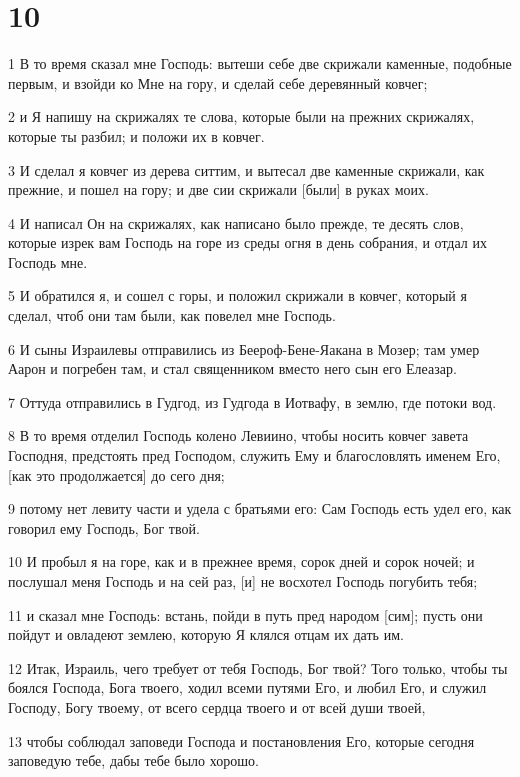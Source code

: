 \chapter{10}

\par 1 В то время сказал мне Господь: вытеши себе две скрижали каменные, подобные первым, и взойди ко Мне на гору, и сделай себе деревянный ковчег;
\par 2 и Я напишу на скрижалях те слова, которые были на прежних скрижалях, которые ты разбил; и положи их в ковчег.
\par 3 И сделал я ковчег из дерева ситтим, и вытесал две каменные скрижали, как прежние, и пошел на гору; и две сии скрижали [были] в руках моих.
\par 4 И написал Он на скрижалях, как написано было прежде, те десять слов, которые изрек вам Господь на горе из среды огня в день собрания, и отдал их Господь мне.
\par 5 И обратился я, и сошел с горы, и положил скрижали в ковчег, который я сделал, чтоб они там были, как повелел мне Господь.
\par 6 И сыны Израилевы отправились из Беероф-Бене-Яакана в Мозер; там умер Аарон и погребен там, и стал священником вместо него сын его Елеазар.
\par 7 Оттуда отправились в Гудгод, из Гудгода в Иотвафу, в землю, где потоки вод.
\par 8 В то время отделил Господь колено Левиино, чтобы носить ковчег завета Господня, предстоять пред Господом, служить Ему и благословлять именем Его, [как это продолжается] до сего дня;
\par 9 потому нет левиту части и удела с братьями его: Сам Господь есть удел его, как говорил ему Господь, Бог твой.
\par 10 И пробыл я на горе, как и в прежнее время, сорок дней и сорок ночей; и послушал меня Господь и на сей раз, [и] не восхотел Господь погубить тебя;
\par 11 и сказал мне Господь: встань, пойди в путь пред народом [сим]; пусть они пойдут и овладеют землею, которую Я клялся отцам их дать им.
\par 12 Итак, Израиль, чего требует от тебя Господь, Бог твой? Того только, чтобы ты боялся Господа, Бога твоего, ходил всеми путями Его, и любил Его, и служил Господу, Богу твоему, от всего сердца твоего и от всей души твоей,
\par 13 чтобы соблюдал заповеди Господа и постановления Его, которые сегодня заповедую тебе, дабы тебе было хорошо.
